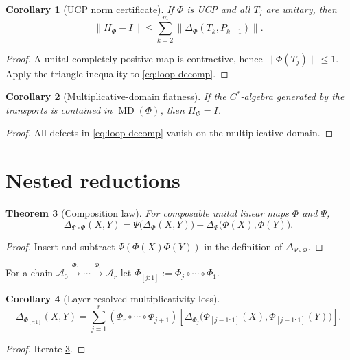 \documentclass[11pt]{article}
\newtheorem{theorem}{Theorem}[section]
\newtheorem{corollary}[theorem]{Corollary}
\theoremstyle{definition}
\theoremstyle{remark}
\newcommand{\MD}{\operatorname{MD}}
\begin{document}
\begin{corollary}[UCP norm certificate]\label{cor:norm}
If $\Phi$ is UCP and all $T_j$ are unitary, then
\begin{equation}\label{eq:norm-cert}
\|H_\Phi-I\|\le \sum_{k=2}^{m}\|\Delta_\Phi(T_k,P_{k-1})\|.
\end{equation}
\end{corollary}
\begin{proof}
A unital completely positive map is contractive, hence $\|\Phi(T_j)\|\le 1$. Apply the triangle inequality to \eqref{eq:loop-decomp}.
\end{proof}

\begin{corollary}[Multiplicative-domain flatness]\label{cor:md-flat}
If the $C^*$-algebra generated by the transports is contained in $\MD(\Phi)$, then $H_\Phi=I$.
\end{corollary}
\begin{proof}
All defects in \eqref{eq:loop-decomp} vanish on the multiplicative domain.
\end{proof}

\section{Nested reductions}
\begin{theorem}[Composition law]\label{thm:composition}
For composable unital linear maps $\Phi$ and $\Psi$,
\begin{equation}\label{eq:composition}
\Delta_{\Psi\circ\Phi}(X,Y)
=\Psi\bigl(\Delta_\Phi(X,Y)\bigr)
+\Delta_\Psi\bigl(\Phi(X),\Phi(Y)\bigr).
\end{equation}
\end{theorem}
\begin{proof}
Insert and subtract $\Psi(\Phi(X)\Phi(Y))$ in the definition of $\Delta_{\Psi\circ\Phi}$.
\end{proof}

For a chain $\mathcal A_0\xrightarrow{\Phi_1}\cdots\xrightarrow{\Phi_r}\mathcal A_r$ let $\Phi_{[j:1]}:=\Phi_j\circ\cdots\circ\Phi_1$.

\begin{corollary}[Layer-resolved multiplicativity loss]\label{cor:layers}
\begin{equation}\label{eq:layers}
\Delta_{\Phi_{[r:1]}}(X,Y)
=\sum_{j=1}^{r}
(\Phi_r\circ\cdots\circ\Phi_{j+1})
\left[
\Delta_{\Phi_j}\bigl(\Phi_{[j-1:1]}(X),\Phi_{[j-1:1]}(Y)\bigr)
\right].
\end{equation}
\end{corollary}
\begin{proof}
Iterate \cref{thm:composition}.
\end{proof}
\end{document}
